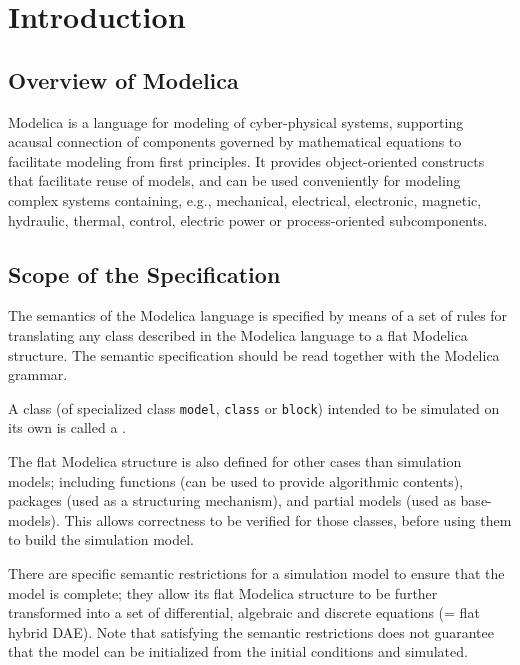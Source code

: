 \chapter{Introduction}\label{introduction1}

\section{Overview of Modelica}\label{overview-of-modelica}

Modelica is a language for modeling of cyber-physical systems, supporting acausal connection of components governed by mathematical equations to facilitate modeling from first principles.
It provides object-oriented constructs that facilitate reuse of models, and can be used conveniently for modeling complex systems containing, e.g., mechanical, electrical, electronic, magnetic, hydraulic, thermal, control, electric power or process-oriented subcomponents.

\section{Scope of the Specification}\label{scope-of-the-specification}

The semantics of the Modelica language is specified by means of a set of rules for translating any class described in the Modelica language to a flat Modelica structure.
The semantic specification should be read together with the Modelica grammar.

A class (of specialized class \lstinline!model!, \lstinline!class! or \lstinline!block!) intended to be simulated on its own is called a .

The flat Modelica structure is also defined for other cases than simulation models; including functions (can be used to provide algorithmic contents), packages (used as a structuring mechanism), and partial models (used as base-models).
This allows correctness to be verified for those classes, before using them to build the simulation model.

There are specific semantic restrictions for a simulation model to ensure that the model is complete; they allow its flat Modelica structure to be further transformed into a set of differential, algebraic and discrete equations (= flat hybrid DAE).
Note that satisfying the semantic restrictions does not guarantee that the model can be initialized from the initial conditions and simulated.

